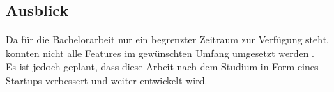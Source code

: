 \subsection{Ausblick}
Da für die Bachelorarbeit nur ein begrenzter Zeitraum zur Verfügung steht, konnten nicht alle Features im gewünschten Umfang umgesetzt werden . \\

Es ist jedoch geplant, dass diese Arbeit nach dem Studium in Form eines Startups verbessert und weiter entwickelt wird.


\newpage